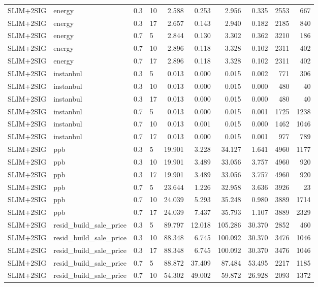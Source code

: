 \begin{longtable}{llllrrrrrr}
SLIM+2SIG & energy & 0.3 & 10 & 2.588 & 0.253 & 2.956 & 0.335 & 2553 & 667 \\
SLIM+2SIG & energy & 0.3 & 17 & 2.657 & 0.143 & 2.940 & 0.182 & 2185 & 840 \\
SLIM+2SIG & energy & 0.7 & 5 & 2.844 & 0.130 & 3.302 & 0.362 & 3210 & 186 \\
SLIM+2SIG & energy & 0.7 & 10 & 2.896 & 0.118 & 3.328 & 0.102 & 2311 & 402 \\
SLIM+2SIG & energy & 0.7 & 17 & 2.896 & 0.118 & 3.328 & 0.102 & 2311 & 402 \\
\midrule
SLIM+2SIG & instanbul & 0.3 & 5 & 0.013 & 0.000 & 0.015 & 0.002 & 771 & 306 \\
SLIM+2SIG & instanbul & 0.3 & 10 & 0.013 & 0.000 & 0.015 & 0.000 & 480 & 40 \\
SLIM+2SIG & instanbul & 0.3 & 17 & 0.013 & 0.000 & 0.015 & 0.000 & 480 & 40 \\
SLIM+2SIG & instanbul & 0.7 & 5 & 0.013 & 0.000 & 0.015 & 0.001 & 1725 & 1238 \\
SLIM+2SIG & instanbul & 0.7 & 10 & 0.013 & 0.001 & 0.015 & 0.000 & 1462 & 1046 \\
SLIM+2SIG & instanbul & 0.7 & 17 & 0.013 & 0.000 & 0.015 & 0.001 & 977 & 789 \\
\midrule
SLIM+2SIG & ppb & 0.3 & 5 & 19.901 & 3.228 & 34.127 & 1.641 & 4960 & 1177 \\
SLIM+2SIG & ppb & 0.3 & 10 & 19.901 & 3.489 & 33.056 & 3.757 & 4960 & 920 \\
SLIM+2SIG & ppb & 0.3 & 17 & 19.901 & 3.489 & 33.056 & 3.757 & 4960 & 920 \\
SLIM+2SIG & ppb & 0.7 & 5 & 23.644 & 1.226 & 32.958 & 3.636 & 3926 & 23 \\
SLIM+2SIG & ppb & 0.7 & 10 & 24.039 & 5.293 & 35.248 & 0.980 & 3889 & 1714 \\
SLIM+2SIG & ppb & 0.7 & 17 & 24.039 & 7.437 & 35.793 & 1.107 & 3889 & 2329 \\
\midrule
SLIM+2SIG & resid_build_sale_price & 0.3 & 5 & 89.797 & 12.018 & 105.286 & 30.370 & 2852 & 460 \\
SLIM+2SIG & resid_build_sale_price & 0.3 & 10 & 88.348 & 6.745 & 100.092 & 30.370 & 3476 & 1046 \\
SLIM+2SIG & resid_build_sale_price & 0.3 & 17 & 88.348 & 6.745 & 100.092 & 30.370 & 3476 & 1046 \\
SLIM+2SIG & resid_build_sale_price & 0.7 & 5 & 88.872 & 37.409 & 87.484 & 53.495 & 2217 & 1185 \\
SLIM+2SIG & resid_build_sale_price & 0.7 & 10 & 54.302 & 49.002 & 59.872 & 26.928 & 2093 & 1372 \\

\end{longtable}
